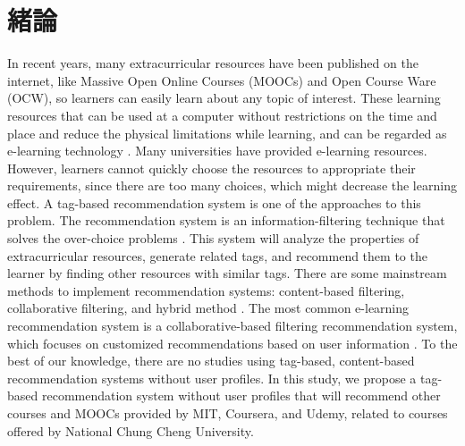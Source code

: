 \chapter{緒論}
\label{chapter:introduction}

In recent years, many extracurricular resources have been published on the internet, like Massive Open Online Courses (MOOCs) and Open Course Ware (OCW), so learners can easily learn about any topic of interest. These learning resources that can be used at a computer without restrictions on the time and place and reduce the physical limitations while learning, and can be regarded as e-learning technology \cite{tan2008}. Many universities have provided e-learning resources. However, learners cannot quickly choose the resources to appropriate their requirements, since there are too many choices, which might decrease the learning effect. 
A tag-based recommendation system is one of the approaches to this problem. The recommendation system is an information-filtering technique that solves the over-choice problems \cite{zhang2019}. This system will analyze the properties of extracurricular resources, generate related tags, and recommend them to the learner by finding other resources with similar tags. There are some mainstream methods to implement recommendation systems: content-based filtering, collaborative filtering, and hybrid method \cite{nagarnaik2015}. The most common e-learning recommendation system is a collaborative-based filtering recommendation system, which focuses on customized recommendations based on user information \cite{ali2022}. To the best of our knowledge, there are no studies using tag-based, content-based recommendation systems without user profiles. 
In this study, we propose a tag-based recommendation system without user profiles that will recommend other courses and MOOCs provided by MIT, Coursera, and Udemy, related to courses offered by National Chung Cheng University.

